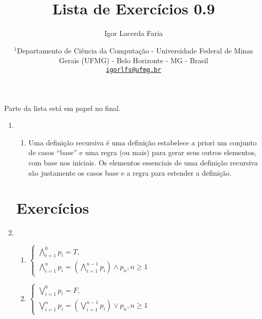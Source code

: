 \documentclass{article}
\author{Igor Lacerda Faria}
\begin{document}
\title{\textbf{Lista de Exercícios 0.9}}

\date{%
\( ^1 \)Departamento de Ciência da Computação - Universidade Federal de Minas Gerais (UFMG) - Belo Horizonte - MG - Brasil \\ [3ex]
\href{mailto:igorlfs@ufmg.br}{\nolinkurl{igorlfs@ufmg.br}}
}

\maketitle

Parte da lista está em papel no final.

\begin{enumerate}

	\section*{Revisão}

	\item

	      \begin{enumerate}

		      \item Uma definição recursiva é uma definição estabelece a priori um conjunto de casos ``base'' e uma regra (ou mais)
		            para gerar seus outros elementos, com base nos iniciais. Os
		            elementos essenciais de uma definição recursiva são justamente
		            os casos base e a regra para estender a definição.

	      \end{enumerate}

	      \section*{Exercícios}

	      \addtocounter{enumi}{3}

	\item

	      \begin{enumerate}

		      \item \(\begin{cases} \bigwedge_{i=1}^0 p_i = T, \\
			            \bigwedge_{i=1}^n p_i =  (\bigwedge_{i=1}^{n-1} p_i) \land
			            p_n, n \geq 1\end{cases}\)

		      \item \(\begin{cases} \bigvee_{i=1}^0 p_i = F, \\ \bigvee_{i=1}^n
			            p_i = (\bigvee_{i=1}^{n-1} p_i) \lor p_n, n \geq 1
		            \end{cases}\)


\end{enumerate}
\end{enumerate}
\end{document}
